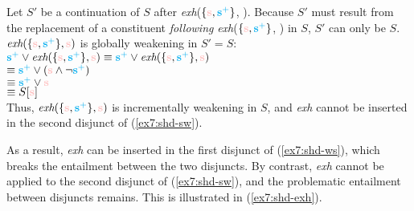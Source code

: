 \begin{exe}
\begin{xlist}
{			Let $S'$ be a continuation of $S$ after \textit{exh}($\lbrace\s, \splus\rbrace$, \s). Because $S'$ must result from the replacement of a constituent \textit{following} \textit{exh}($\lbrace\s, \splus\rbrace$, \s) in $S$, $S'$ can only be $S$. $\textit{exh}(\lbrace\s, \splus\rbrace, \s)$ is globally weakening in $S'=S$:\\
			$\splus \vee \textit{exh}(\lbrace\s, \splus\rbrace, \s) \equiv \splus \vee \textit{exh}(\lbrace\s, \splus\rbrace, \s)$\\
			 $\equiv \splus \vee (\s\wedge\neg\splus)$\\
			 $\equiv \splus \vee\s$\\
			 $\equiv S[\s]$\\
			Thus, $\textit{exh}(\lbrace\s, \splus\rbrace, \s)$ is incrementally weakening in $S$, and \textit{exh} cannot be inserted in the second disjunct of (\ref{ex7:shd-sw}).\\ }\label{ex7:iw-hd-sw}
	\end{xlist}
\end{exe}

As a result, \textit{exh} can be inserted in the first disjunct of (\ref{ex7:shd-ws}), which breaks the entailment between the two disjuncts. By contrast, \textit{exh} cannot be applied to the second disjunct of (\ref{ex7:shd-sw}), and the problematic entailment between disjuncts remains. This is illustrated in (\ref{ex7:shd-exh}).


\begin{exe}
	\ex\label{ex7:shd-exh2}
	\begin{xlist}
		\label{ex7:shd-ws-exh2}
		\label{ex7:shd-sw-exh2}
	\end{xlist}
\end{exe}


